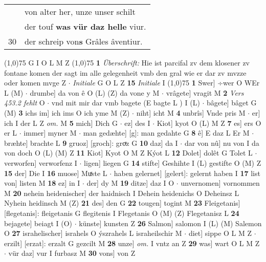 \documentclass[8pt,a4paper,notitlepage]{article}
\begin{document}
\begin{table}[ht]
\begin{minipage}[t]{0.5\linewidth}
\begin{tabular}{rl}
 & von alter her, unze unser schilt\\ 
 & der touf \textbf{was} \textbf{vür daz helle} viur.\\ 
30 & der schreip von\textbf{s} Grâles âventiur.\\ 
\end{tabular}
\scriptsize
\line(1,0){75} \newline
G I O L M Z \newline
\line(1,0){75} \newline
\textbf{1} \textit{Überschrift:} Hie ist parcifal zv dem klosener zv fontane komen der sagt im alle gelegenheit vmb den gral wie er dar zv mvzze oder komen mvge Z   $\cdot$ \textit{Initiale} G O L Z  \textbf{15} \textit{Initiale} I  \newline
\line(1,0){75} \newline
\textbf{1} Swer] ÷wer O WEr L (M)  $\cdot$ drumbe] da von ê O (L) (Z) da vone y M  $\cdot$ vrâgete] vragit M \textbf{2} \textit{Vers 453.2 fehlt} O   $\cdot$ vnd mit mir dar vmb bagete (E bagte L ) I (L)  $\cdot$ bâgete] bâget G (M) \textbf{3} ichs im] ich ims O ich yme M (Z)  $\cdot$ niht] icht M \textbf{4} unbrîs] Vnde pris M  $\cdot$ er] ich I der L Z \textit{om.} M \textbf{5} mich] Dich G  $\cdot$ ez] des I  $\cdot$ Kiot] kyot O (L) M Z \textbf{7} es] ers O er L  $\cdot$ immer] myner M  $\cdot$ man gedæhte] [g]: man gedahte G \textbf{8} ê] E daz L Er M  $\cdot$ bræhte] brachte L \textbf{9} gruoz] [groch]: groͮz G \textbf{10} daz] da I  $\cdot$ dar von nû] nu von I da von doch O (L) (M) Z \textbf{11} Kiot] Kyot O M Z Kýot L \textbf{12} Dolet] dolêt G Tolet L  $\cdot$ verworfen] verworfenz I  $\cdot$ ligen] liegen G \textbf{14} stifte] Geshihte I (L) gestifte O (M) Z \textbf{15} der] Die I \textbf{16} muose] Muͯste L  $\cdot$ haben gelernet] [gelert]: gelernt haben I \textbf{17} list von] listen M \textbf{18} ez] in I  $\cdot$ der] dy M \textbf{19} ditze] daz I O  $\cdot$ unvernomen] vornommen M \textbf{20} nehein heidenischer] der haidnisch I Dehein heidenichs O Deheinsz L Nyhein heidinsch M (Z) \textbf{21} des] den G \textbf{22} tougen] togint M \textbf{23} Fleigetanis] [flegetanis]: fleigetanis G flegitenis I Flegetanis O (M) (Z) Flegetanisz L \textbf{24} bejagete] beiagt I (O)  $\cdot$ künste] kunsten Z \textbf{26} Salmon] salomon I (L) (M) Salemon O \textbf{27} israhelischer] israhels O ýszrahels L israheilschir M  $\cdot$ diet] sippe O L M Z  $\cdot$ erzilt] [erzat]: erzalt G gezcilt M \textbf{28} unze] \textit{om.} I vntz an Z \textbf{29} was] wart O L M Z  $\cdot$ vür daz] vur I furbasz M \textbf{30} vons] von Z \newline

\end{minipage}
\end{table}
\end{document}
